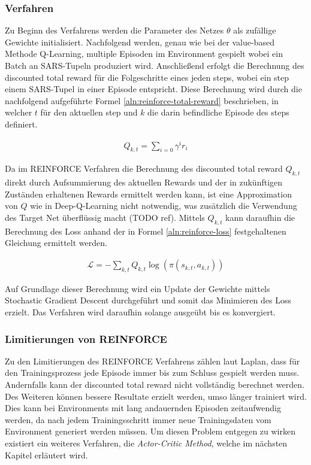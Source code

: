 \documentclass[11pt]{scrartcl}
\begin{document}
\subsubsection{Verfahren}
Zu Beginn des Verfahrens werden die Parameter des Netzes $\theta$ als zufällige Gewichte
initialisiert. Nachfolgend werden, genau wie bei der value-based Methode Q-Learning,
multiple Episoden im Environment gespielt wobei ein Batch an SARS-Tupeln produziert wird.
Anschließend erfolgt die Berechnung des discounted total reward für die Folgeschritte eines
jeden steps, wobei ein step einem SARS-Tupel in einer Episode entspricht. Diese Berechnung
wird durch die nachfolgend aufgeführte Formel \ref{aln:reinforce-total-reward} beschrieben,
in welcher $t$ für den aktuellen step und $k$ die darin befindliche Episode des steps
definiert. 

\begin{align}
Q_{k,t}=\sum_{i=0} \gamma^{i}r_{i}
\label{aln:reinforce-total-reward}
\end{align}

Da im REINFORCE Verfahren die Berechnung des discounted total reward $Q_{k,t}$ direkt durch
Aufsummierung des aktuellen Rewards und der in zukünftigen Zuständen erhaltenen Rewards
ermittelt werden kann, ist eine Approximation von $Q$ wie in Deep-Q-Learning nicht notwendig,
was zusätzlich die Verwendung des Target Net überflüssig macht (TODO ref). %
Mittels $Q_{k,t}$ kann daraufhin die Berechnung des Loss anhand der in Formel
\ref{aln:reinforce-loss} festgehaltenen Gleichung ermittelt werden.

\begin{align}
\mathcal{L}=-\sum_{k,t}Q_{k,t}\log(\pi(s_{k,t},a_{k,t}))
\label{aln:reinforce-loss}
\end{align}

Auf Grundlage dieser Berechnung wird ein Update der Gewichte mittels Stochastic
Gradient Descent durchgeführt und somit das Minimieren des Loss erzielt. Das Verfahren
wird daraufhin solange ausgeübt bis es konvergiert.

\subsubsection{Limitierungen von REINFORCE}
\label{sec:limit-reinforce}
Zu den Limitierungen des REINFORCE Verfahrens zählen laut Laplan\cite[~S.252]{L2018}, dass für den
Trainingsprozess jede Episode immer bis zum Schluss gespielt werden muss. Andernfalls kann der
discounted total reward nicht vollständig berechnet werden. Des Weiteren können bessere Resultate
erzielt werden, umso länger trainiert wird. Dies kann bei Environments mit lang andauernden Episoden
zeitaufwendig werden, da nach jedem Trainingsschritt immer neue Trainingsdaten vom Environment
generiert werden müssen. Um diesen Problem entgegen zu wirken existiert ein weiteres Verfahren, die
\textit{Actor-Critic Method}, welche im nächsten Kapitel erläutert wird. 
\end{document}
